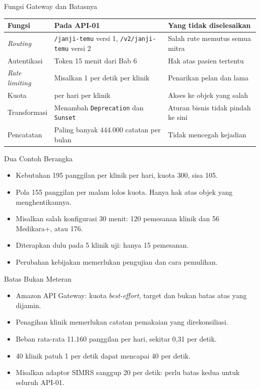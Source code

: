 \documentclass[aspectratio=169, table, 12pt]{beamer}
\begin{document}
\begin{frame}{{\Large Fungsi Gateway dan Batasnya}}
  \footnotesize
  \begin{tabularx}{\textwidth}{>{\raggedright\arraybackslash}p{2.3cm} >{\raggedright\arraybackslash}X >{\raggedright\arraybackslash}p{4.4cm}}
    \hline
    \textbf{Fungsi} & \textbf{Pada API-01} & \textbf{Yang tidak diselesaikan} \\ \hline
    \textit{Routing} & \texttt{/janji-temu} versi 1, \texttt{/v2/janji-temu} versi 2 & Salah rute memutus semua mitra \\ \hline
    Autentikasi & Token 15 menit dari Bab 6 & Hak atas pasien tertentu \\ \hline
    \textit{Rate limiting} & Misalkan 1 per detik per klinik & Penarikan pelan dan lama \\ \hline
    Kuota & 300 per hari per klinik & Akses ke objek yang salah \\ \hline
    Transformasi & Menambah \texttt{Deprecation} dan \texttt{Sunset} & Aturan bisnis tidak pindah ke sini \\ \hline
    Pencatatan & Paling banyak 444.000 catatan per bulan & Tidak mencegah kejadian \\ \hline
  \end{tabularx}
\end{frame}

\begin{frame}{{\Large Dua Contoh Berangka}}
  \vspace{8pt}
  \begin{itemize}
    \item Kebutuhan 195 panggilan per klinik per hari, kuota 300, sisa 105.
    \item Pola 155 panggilan per malam lolos kuota. Hanya hak atas objek yang menghentikannya.
    \item Misalkan salah konfigurasi 30 menit: 120 pemesanan klinik dan 56 Medikara+, atau 176.
    \item Diterapkan dulu pada 5 klinik uji: hanya 15 pemesanan.
    \item Perubahan kebijakan memerlukan pengujian dan cara pemulihan.
  \end{itemize}
\end{frame}

\begin{frame}{{\Large Batas Bukan Meteran}}
  \vspace{8pt}
  \begin{itemize}
    \item Amazon API Gateway: kuota \textit{best-effort}, target dan bukan batas atas yang dijamin.
    \item Penagihan klinik memerlukan catatan pemakaian yang direkonsiliasi.
    \item Beban rata-rata 11.160 panggilan per hari, sekitar 0,31 per detik.
    \item 40 klinik patuh 1 per detik dapat mencapai 40 per detik.
    \item Misalkan adaptor SIMRS sanggup 20 per detik: perlu batas kedua untuk seluruh API-01.
  \end{itemize}
\end{frame}
\end{document}
